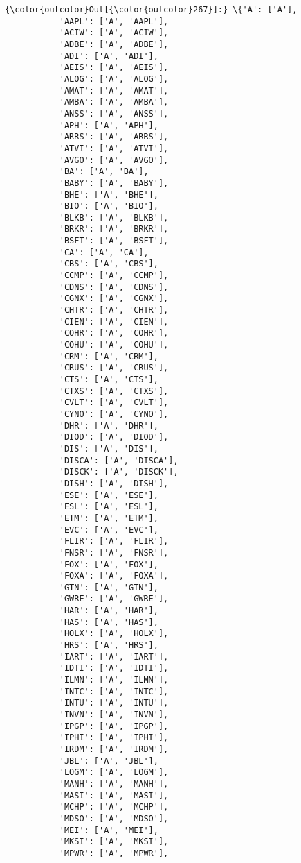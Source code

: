 \documentclass[11pt]{article}
\begin{document}
\begin{Verbatim}[commandchars=\\\{\}]
{\color{outcolor}Out[{\color{outcolor}267}]:} \{'A': ['A'],
           'AAPL': ['A', 'AAPL'],
           'ACIW': ['A', 'ACIW'],
           'ADBE': ['A', 'ADBE'],
           'ADI': ['A', 'ADI'],
           'AEIS': ['A', 'AEIS'],
           'ALOG': ['A', 'ALOG'],
           'AMAT': ['A', 'AMAT'],
           'AMBA': ['A', 'AMBA'],
           'ANSS': ['A', 'ANSS'],
           'APH': ['A', 'APH'],
           'ARRS': ['A', 'ARRS'],
           'ATVI': ['A', 'ATVI'],
           'AVGO': ['A', 'AVGO'],
           'BA': ['A', 'BA'],
           'BABY': ['A', 'BABY'],
           'BHE': ['A', 'BHE'],
           'BIO': ['A', 'BIO'],
           'BLKB': ['A', 'BLKB'],
           'BRKR': ['A', 'BRKR'],
           'BSFT': ['A', 'BSFT'],
           'CA': ['A', 'CA'],
           'CBS': ['A', 'CBS'],
           'CCMP': ['A', 'CCMP'],
           'CDNS': ['A', 'CDNS'],
           'CGNX': ['A', 'CGNX'],
           'CHTR': ['A', 'CHTR'],
           'CIEN': ['A', 'CIEN'],
           'COHR': ['A', 'COHR'],
           'COHU': ['A', 'COHU'],
           'CRM': ['A', 'CRM'],
           'CRUS': ['A', 'CRUS'],
           'CTS': ['A', 'CTS'],
           'CTXS': ['A', 'CTXS'],
           'CVLT': ['A', 'CVLT'],
           'CYNO': ['A', 'CYNO'],
           'DHR': ['A', 'DHR'],
           'DIOD': ['A', 'DIOD'],
           'DIS': ['A', 'DIS'],
           'DISCA': ['A', 'DISCA'],
           'DISCK': ['A', 'DISCK'],
           'DISH': ['A', 'DISH'],
           'ESE': ['A', 'ESE'],
           'ESL': ['A', 'ESL'],
           'ETM': ['A', 'ETM'],
           'EVC': ['A', 'EVC'],
           'FLIR': ['A', 'FLIR'],
           'FNSR': ['A', 'FNSR'],
           'FOX': ['A', 'FOX'],
           'FOXA': ['A', 'FOXA'],
           'GTN': ['A', 'GTN'],
           'GWRE': ['A', 'GWRE'],
           'HAR': ['A', 'HAR'],
           'HAS': ['A', 'HAS'],
           'HOLX': ['A', 'HOLX'],
           'HRS': ['A', 'HRS'],
           'IART': ['A', 'IART'],
           'IDTI': ['A', 'IDTI'],
           'ILMN': ['A', 'ILMN'],
           'INTC': ['A', 'INTC'],
           'INTU': ['A', 'INTU'],
           'INVN': ['A', 'INVN'],
           'IPGP': ['A', 'IPGP'],
           'IPHI': ['A', 'IPHI'],
           'IRDM': ['A', 'IRDM'],
           'JBL': ['A', 'JBL'],
           'LOGM': ['A', 'LOGM'],
           'MANH': ['A', 'MANH'],
           'MASI': ['A', 'MASI'],
           'MCHP': ['A', 'MCHP'],
           'MDSO': ['A', 'MDSO'],
           'MEI': ['A', 'MEI'],
           'MKSI': ['A', 'MKSI'],
           'MPWR': ['A', 'MPWR'],

\end{Verbatim}
\end{document}
